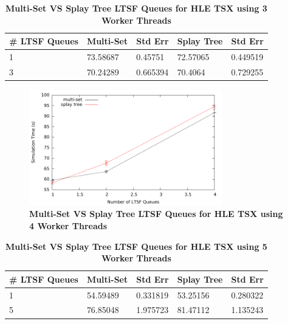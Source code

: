 \documentclass[11pt]{book}
\begin{document}
\begin{table}[H]
\centering
\begin{tabular}{l|p{2cm}|p{2cm}|p{2cm}|p{2cm}}
    \textbf{\# LTSF Queues}&Multi-Set &Std Err &Splay Tree &Std Err\\
    \hline
    \midrule
        1 &73.58687   &0.45751  &72.57065   &0.449519\\ 
        3 &70.24289   &0.665394 &70.4064    &0.729255\\
\end{tabular}
\caption{\textbf{Multi-Set VS Splay Tree LTSF Queues for HLE TSX using 3 Worker
    Threads}}\label{tab:noThrMig_3threadsXschq_msVSst_hle}
\end{table}

\begin{figure}[H]
    \centering
    \graphicspath{ {./figures/} }
    \includegraphics[width=0.75\textwidth,keepaspectratio]{hugeepidemicsim-NOmig-timeVSschedQs-msVSst-4thread-hle}
\caption{\textbf{Multi-Set VS Splay Tree LTSF Queues for HLE TSX using 4 Worker
    Threads}}\label{fig:noThrMig_timeVSschq_4threads_msVSst_hle}
\end{figure}

\begin{table}[H]
\centering
\begin{tabular}{l|p{2cm}|p{2cm}|p{2cm}|p{2cm}}
    \textbf{\# LTSF Queues}&Multi-Set &Std Err &Splay Tree &Std Err\\
    \hline
    \midrule
        1 &54.59489   &0.331819 &53.25156   &0.280322\\ 
        5 &76.85048   &1.975723 &81.47112   &1.135243\\
\end{tabular}
\caption{\textbf{Multi-Set VS Splay Tree LTSF Queues for HLE TSX using 5 Worker
    Threads}}\label{tab:noThrMig_5threadsXschq_msVSst_hle}
\end{table}
\end{document}
